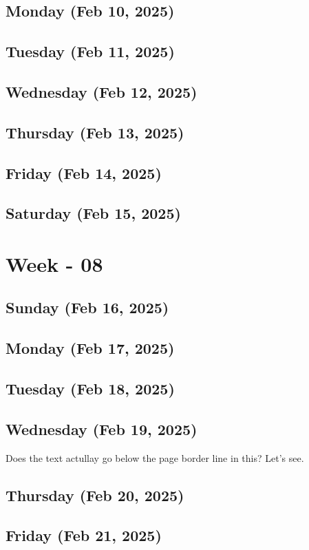 \subsection*{Monday (Feb 10, 2025)}
\subsection*{Tuesday (Feb 11, 2025)}
\subsection*{Wednesday (Feb 12, 2025)}
\subsection*{Thursday (Feb 13, 2025)}
\subsection*{Friday (Feb 14, 2025)}
\subsection*{Saturday (Feb 15, 2025)}

\section{Week - 08}
\subsection*{Sunday (Feb 16, 2025)}
\subsection*{Monday (Feb 17, 2025)}
\subsection*{Tuesday (Feb 18, 2025)}
\subsection*{Wednesday (Feb 19, 2025)}
Does the text actullay go below the page border line in this? Let's see.
\subsection*{Thursday (Feb 20, 2025)}
\subsection*{Friday (Feb 21, 2025)}
